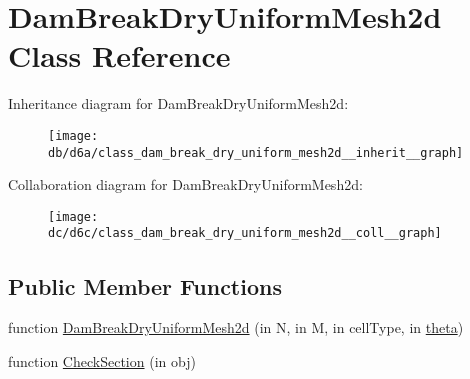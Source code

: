 \hypertarget{class_dam_break_dry_uniform_mesh2d}{}\section{Dam\+Break\+Dry\+Uniform\+Mesh2d Class Reference}
\label{class_dam_break_dry_uniform_mesh2d}


Inheritance diagram for Dam\+Break\+Dry\+Uniform\+Mesh2d\+:
\nopagebreak
\begin{figure}[H]
\begin{center}
\leavevmode
\texttt{[image: db/d6a/class\_dam\_break\_dry\_uniform\_mesh2d\_\_inherit\_\_graph]}
\end{center}
\end{figure}


Collaboration diagram for Dam\+Break\+Dry\+Uniform\+Mesh2d\+:
\nopagebreak
\begin{figure}[H]
\begin{center}
\leavevmode
\texttt{[image: dc/d6c/class\_dam\_break\_dry\_uniform\_mesh2d\_\_coll\_\_graph]}
\end{center}
\end{figure}
\subsection*{Public Member Functions}
\begin{DoxyCompactItemize}
\item 
function \hyperlink{class_dam_break_dry_uniform_mesh2d_adb07e7c79f219ee3928c69c8414abbfc}{Dam\+Break\+Dry\+Uniform\+Mesh2d} (in N, in M, in cell\+Type, in \hyperlink{class_dam_break_dry_uniform_mesh2d_a9081a911c9c984f7f7ce43963ff2758c}{theta})
\item 
function \hyperlink{class_dam_break_dry_uniform_mesh2d_a5c1949a548a74fa82d7dd12273974fa7}{Check\+Section} (in obj)
\end{DoxyCompactItemize}
